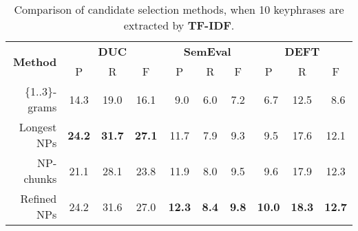       \begin{table}
        \centering
        \begin{tabular}{rccccccccc}
          \toprule
          \multirow{2}{*}[-2pt]{\textbf{Method}} & \multicolumn{3}{c}{\textbf{DUC}} & \multicolumn{3}{c}{\textbf{SemEval}} & \multicolumn{3}{c}{\textbf{DEFT}}\\
          \cmidrule(r){2-4}\cmidrule(lr){5-7}\cmidrule(l){8-10}
          & P & R & F & P & R & F & P & R & F\\
          \midrule
          \{1..3\}-grams & 14.3 & 19.0 & 16.1 & $~~$9.0 & $~~$6.0 & $~~$7.2 & $~~$6.7 & 12.5 & $~~$8.6\\
          Longest NPs & \textbf{24.2} & \textbf{31.7} & \textbf{27.1} & 11.7 & $~~$7.9 & $~~$9.3 & $~~$9.5 & 17.6 & 12.1\\
          NP-chunks & 21.1 & 28.1 & 23.8 & 11.9 & $~~$8.0 & $~~$9.5 & $~~$9.6 & 17.9 & 12.3\\
          Refined NPs & 24.2 & 31.6 & 27.0 & \textbf{12.3} & \textbf{$~~$8.4} &
     \textbf{$~~$9.8} & \textbf{10.0} & \textbf{18.3} & \textbf{12.7}\\
          \bottomrule
        \end{tabular}
        \caption{Comparison of candidate selection methods, when 10 keyphrases
                 are extracted by \textbf{TF-IDF}.
                 \label{tab:tfidf_results}}
      \end{table}
